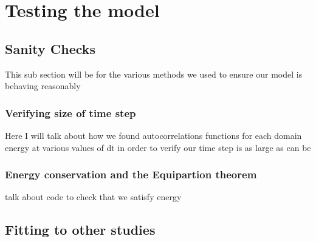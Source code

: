 \section{Testing the model} 
\subsection{Sanity Checks}
This sub section will be for the various methods we used to ensure our model is behaving reasonably 
\subsubsection{Verifying size of time step} 
Here I will talk about how we found autocorrelations functions for each domain energy at various values of dt in order to verify our time step is as large as can be
\subsubsection{Energy conservation and the Equipartion theorem} 
talk about code to check that we satisfy energy 
\subsection{Fitting to other studies} 	